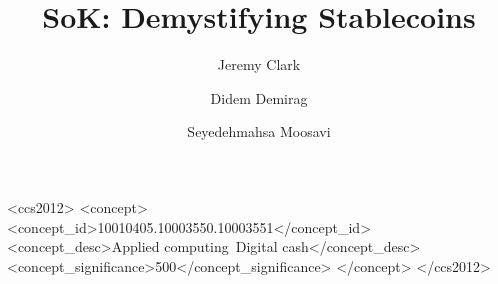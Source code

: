 \documentclass[sigconf,anonymous]{acmart}
\begin{document}
\title{SoK: Demystifying Stablecoins}

\author{Jeremy Clark}
\author{Didem Demirag}
\author{Seyedehmahsa Moosavi}



\begin{CCSXML}
<ccs2012>
<concept>
<concept_id>10010405.10003550.10003551</concept_id>
<concept_desc>Applied computing~Digital cash</concept_desc>
<concept_significance>500</concept_significance>
</concept>
</ccs2012>
\end{CCSXML}



\maketitle






\end{document}
